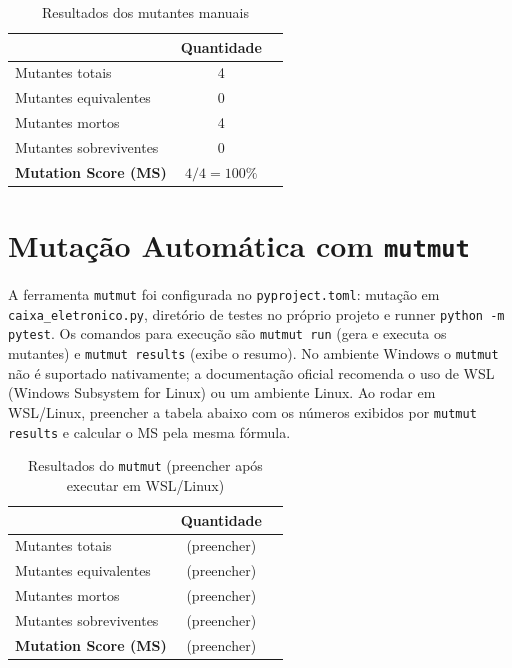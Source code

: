 \documentclass[11pt,a4paper]{article}
\begin{document}
\begin{table}[H]
  \centering
  \caption{Resultados dos mutantes manuais}
  \label{tab:mutantes-manuais}
  \begin{tabular}{lcc}
    \toprule
    & Quantidade & \\
    \midrule
    Mutantes totais                & 4 & \\
    Mutantes equivalentes         & 0 & \\
    Mutantes mortos               & 4 & \\
    Mutantes sobreviventes        & 0 & \\
    \midrule
    \textbf{Mutation Score (MS)}  & $4/4 = 100\%$ & \\
    \bottomrule
  \end{tabular}
\end{table}

\section{Mutação Automática com \texttt{mutmut}}

A ferramenta \texttt{mutmut} foi configurada no \texttt{pyproject.toml}: mutação em \texttt{caixa\_eletronico.py}, diretório de testes no próprio projeto e runner \texttt{python -m pytest}. Os comandos para execução são \texttt{mutmut run} (gera e executa os mutantes) e \texttt{mutmut results} (exibe o resumo). No ambiente Windows o \texttt{mutmut} não é suportado nativamente; a documentação oficial recomenda o uso de WSL (Windows Subsystem for Linux) ou um ambiente Linux. Ao rodar em WSL/Linux, preencher a tabela abaixo com os números exibidos por \texttt{mutmut results} e calcular o MS pela mesma fórmula.

\begin{table}[H]
  \centering
  \caption{Resultados do \texttt{mutmut} (preencher após executar em WSL/Linux)}
  \label{tab:mutmut}
  \begin{tabular}{lcc}
    \toprule
    & Quantidade & \\
    \midrule
    Mutantes totais                & (preencher) & \\
    Mutantes equivalentes         & (preencher) & \\
    Mutantes mortos                & (preencher) & \\
    Mutantes sobreviventes        & (preencher) & \\
    \midrule
    \textbf{Mutation Score (MS)}   & (preencher) & \\
    \bottomrule
  \end{tabular}
\end{table}
\end{document}

